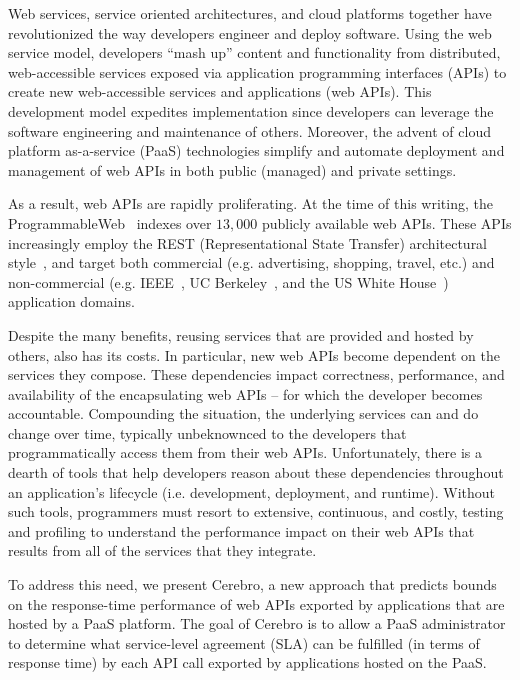 Web services, service oriented architectures, and cloud platforms together have
revolutionized the way developers engineer and deploy software.
Using the web service model, developers ``mash up'' content and functionality 
from distributed, web-accessible services 
exposed via application programming interfaces (APIs)
to create new web-accessible services and applications (web APIs).  
This development model expedites implementation since developers can leverage the 
software engineering and maintenance of others.
Moreover, the advent of cloud platform as-a-service (PaaS) technologies 
simplify and automate deployment and management
of web APIs in both public (managed) and private settings.  

As a result, web APIs are rapidly 
proliferating.  At the time of this writing, 
the ProgrammableWeb~\cite{pweb} indexes over $13,000$
publicly available web APIs.
These APIs increasingly employ the REST (Representational State Transfer) 
architectural style~\cite{Fielding:2000:ASD:932295}, and target both
commercial (e.g. advertising, shopping, travel, etc.) and non-commercial
(e.g. IEEE~\cite{ieeeapis}, UC Berkeley~\cite{ucbapis}, and the US White
House~\cite{whitehouseapis}) application domains.

Despite the many benefits, reusing services that are provided and hosted
by others, also has its costs.  
In particular, new web APIs become dependent on the 
services they compose.  These dependencies
impact correctness, performance, and availability of the encapsulating 
web APIs -- for which the developer becomes accountable.  
Compounding the situation, the underlying services can and do change over time, typically
unbeknownced to the developers that programmatically access them from their web APIs.
Unfortunately, there is a dearth of tools that help developers reason about these 
dependencies throughout an application's 
lifecycle (i.e. development, deployment, and runtime).  Without such tools, 
programmers must resort to extensive, continuous, and costly, testing and profiling 
to understand the performance impact on their web APIs 
that results from all of the services that they integrate.

To address this need, we present Cerebro, a new approach that
predicts bounds on 
the response-time performance of web
APIs exported by applications that are hosted by a PaaS platform.
The goal of Cerebro is to allow 
a PaaS administrator to determine what service-level agreement (SLA) can be
fulfilled (in terms of response time) 
by each API call exported by applications
hosted on the PaaS.  

